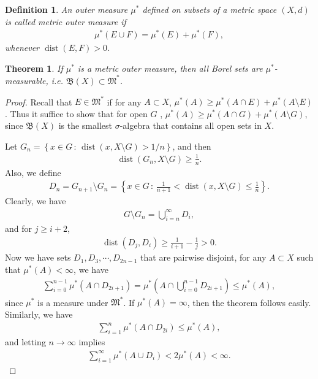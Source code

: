 \documentclass[11pt]{book}
\newtheorem{definition}{Definition}[chapter]
\newtheorem{theorem}{Theorem}[chapter]
\theoremstyle{definition}
\numberwithin{equation}{chapter}
\def\MM{\mathfrak{M}}
\begin{document}
\medskip

\begin{definition}
An outer measure $\mu^*$ defined on subsets of a metric space $(X,d)$ is called metric outer measure if 
\begin{align*}
    \mu^*(E \cup F) = \mu^*(E) + \mu^*(F),
\end{align*}
whenever $\operatorname{dist}(E,F) > 0$.
\end{definition}

\medskip

\begin{theorem}\label{theorem_113}
If $\mu^*$ is a metric outer measure, then all Borel sets are $\mu^*$-measurable, i.e. $\mathfrak{B}(X) \subset \MM^*$.
\end{theorem}
\begin{proof}
Recall that $E \in \MM^*$ if for any $A \subset X$, $\mu^*(A) \geq \mu^*(A \cap E) + \mu^*(A \setminus E)$. Thus it suffice to show that for open $G$ , $\mu^*(A) \geq \mu^*(A \cap G) + \mu^*(A \setminus G)$, since $\mathfrak{B}(X)$ is the smallest $\sigma$-algebra that contains all open sets in $X$.

Let $G_n = \left\{x \in G \,:\, \operatorname{dist}(x, X \setminus G) > 1/n \right\}$, and then 
\begin{align*}
    \operatorname{dist}(G_n, X \setminus G) \geq \frac{1}{n}.
\end{align*}
Also, we define 
\begin{align*}
    D_n = G_{n+1}\setminus G_n = \left\{x \in G \, :\, \frac{1}{n+1} < \operatorname{dist}(x, X \setminus G) \leq \frac{1}{n} \right\}.
\end{align*}
Clearly, we have 
\begin{align}\label{equation_15}
    G \setminus G_n = \bigcup^\infty_{i=n} D_i,
\end{align}
and for $j \geq i + 2$, 
\begin{align*}
    \operatorname{dist}(D_j,D_i) \geq \frac{1}{i+1} - \frac{1}{j} > 0.
\end{align*}
Now we have sets $D_1, D_3, \cdots, D_{2n-1}$ that are pairwise disjoint, for any $A \subset X$ such that $\mu^*(A) < \infty$, we have
\begin{align*}
    \sum^{n-1}_{i=0}\mu^*\left(A \cap D_{2i+1}\right) = \mu^* \left(A \cap \bigcup^{n-1}_{i=0} D_{2i+1} \right) \leq \mu^*(A),
\end{align*}
since $\mu^*$ is a measure under $\MM^*$. If $\mu^*(A) = \infty$, then the theorem follows easily. Similarly, we have
\begin{align*}
    \sum^{n}_{i=1}\mu^*\left(A \cap D_{2i}\right) \leq \mu^*(A),
\end{align*}
and letting $n \to \infty$ implies 
\begin{align*}
    \sum^\infty_{i=1} \mu^* \left(A \cup D_i \right) < 2 \mu^*(A) < \infty.
\end{align*}


\end{proof}
\end{document}
